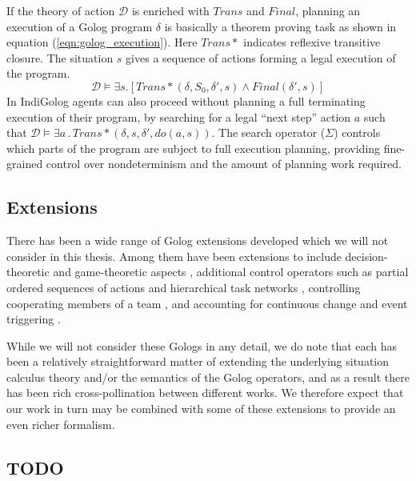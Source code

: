 If the theory of action $\mathcal{D}$ is enriched with $Trans$ and
$Final$, planning an execution of a Golog program $\delta$ is basically
a theorem proving task as shown in equation (\ref{eqn:golog_execution}).
Here $Trans*$ indicates reflexive transitive closure. The situation
$s$ gives a sequence of actions forming a legal execution of the
program.\begin{equation}
\mathcal{D}\models\exists s.\left[Trans*(\delta,S_{0},\delta',s)\wedge Final(\delta',s)\right]\label{eqn:Background:golog_execution}\end{equation}
 In IndiGolog agents can also proceed without planning a full terminating
execution of their program, by searching for a legal {}``next step''
action $a$ such that $\mathcal{D}\models\exists a\,.\, Trans*(\delta,s,\delta',do(a,s))$.
The search operator ($\Sigma$) controls which parts of the program
are subject to full execution planning, providing fine-grained control
over nondeterminism and the amount of planning work required.


\subsection{Extensions}

There has been a wide range of Golog extensions developed which we
will not consider in this thesis. Among them have been extensions
to include decision-theoretic \citep{boutilier00dtgolog} and game-theoretic
aspects \citep{finzi03gtgolog,finzi05pogtgolog}, additional control
operators such as partial ordered sequences of actions \citep{son00htn_golog}
and hierarchical task networks \citep{Gabaldon02htn_in_golog,Son04golog+htn+time},
controlling cooperating members of a team \citep{farinelli07team_golog},
and accounting for continuous change and event triggering \citep{grosskreutz00ccgolog}.

While we will not consider these Gologs in any detail, we do note
that each has been a relatively straightforward matter of extending
the underlying situation calculus theory and/or the semantics of the
Golog operators, and as a result there has been rich cross-pollination
between different works. We therefore expect that our work in turn
may be combined with some of these extensions to provide an even richer
formalism.


\subsection{TODO}

